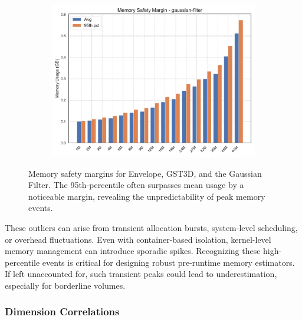 \begin{figure}[htbp]
\begin{subfigure}[t]{0.49\textwidth}
        \includegraphics[width=\textwidth]{assets/images/05/memory_safety_margin_gaussian-filter}
    \end{subfigure}
    \caption{Memory safety margins for Envelope, \ac{GST3D}, and the Gaussian Filter. The 95th-percentile often surpasses mean usage by a noticeable margin, revealing the unpredictability of peak memory events.}
    \label{fig:memory_safety_margin}
\end{figure}

These outliers can arise from transient allocation bursts, system-level scheduling, or overhead fluctuations.
Even with container-based isolation, kernel-level memory management can introduce sporadic spikes.
Recognizing these high-percentile events is critical for designing robust pre-runtime memory estimators.
If left unaccounted for, such transient peaks could lead to underestimation, especially for borderline volumes.



\subsubsection{Dimension Correlations}
\label{subsec:dimension-correlations}


